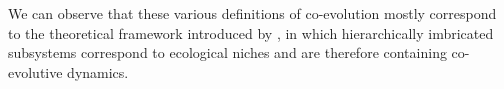 \documentclass[11pt]{article}
\begin{document}

We can observe that these various definitions of co-evolution mostly correspond to the theoretical framework introduced by \cite{holland2012signals}, in which hierarchically imbricated subsystems correspond to ecological niches and are therefore containing co-evolutive dynamics.
\end{document}
